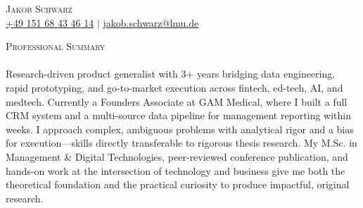 \documentclass[a4paper]{article}
\newcommand{\lineunder} {
    \vspace*{-8pt} \\
    \hspace*{-18pt} \hrulefill \\
}
\newcommand{\header} [1] {
    {\hspace*{-18pt}\vspace*{6pt} \textsc{#1}}
    \vspace*{-6pt} \lineunder
}
\begin{document}
\vspace*{-40pt}
    

\vspace*{-10pt}
\begin{center}
	{\Huge \scshape {Jakob Schwarz}}\\
	\href{tel:+4915168434614}{+49 151 68 43 46 14} $\mid$ \href{mailto:jakob.schwarz@lmu.de}{jakob.schwarz@lmu.de}
\end{center}

\header{Professional Summary}

Research-driven product generalist with 3+ years bridging data engineering, rapid prototyping, and go-to-market execution across fintech, ed-tech, AI, and medtech. Currently a Founders Associate at GAM Medical, where I built a full CRM system and a multi-source data pipeline for management reporting within weeks. I approach complex, ambiguous problems with analytical rigor and a bias for execution—skills directly transferable to rigorous thesis research. My M.Sc. in Management \& Digital Technologies, peer-reviewed conference publication, and hands-on work at the intersection of technology and business give me both the theoretical foundation and the practical curiosity to produce impactful, original research.\\

\vspace{1mm}
\end{document}
